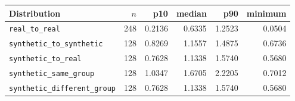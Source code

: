 \scriptsize
\setlength{\tabcolsep}{3pt}
\begin{tabular}{lrrrrr}
\toprule
Distribution & $n$ & p10 & median & p90 & minimum\\
\midrule
\texttt{real\_to\_real} & 248 & 0.2136 & 0.6335 & 1.2523 & 0.0504\\
\texttt{synthetic\_to\_synthetic} & 128 & 0.8269 & 1.1557 & 1.4875 & 0.6736\\
\texttt{synthetic\_to\_real} & 128 & 0.7628 & 1.1338 & 1.5740 & 0.5680\\
\texttt{synthetic\_same\_group} & 128 & 1.0347 & 1.6705 & 2.2205 & 0.7012\\
\texttt{synthetic\_different\_group} & 128 & 0.7628 & 1.1338 & 1.5740 & 0.5680\\
\bottomrule
\end{tabular}
\normalsize
\setlength{\tabcolsep}{6pt}
